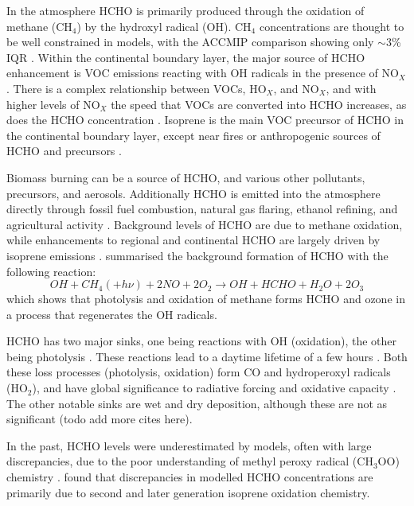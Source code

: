     In the atmosphere HCHO is primarily produced through the oxidation of methane (CH$_4$) by the hydroxyl radical (OH).
    CH$_4$ concentrations are thought to be well constrained in models, with the ACCMIP comparison showing only $\sim3$\% IQR \citep{Young2013}.
    Within the continental boundary layer, the major source of HCHO enhancement is VOC emissions reacting with OH radicals in the presence of NO$_X$ \citep{Wagner2002, Millet2006, Kefauver2014}.
    There is a complex relationship between VOCs, HO$_X$, and NO$_X$, and with higher levels of NO$_X$ the speed that VOCs are converted into HCHO increases, as does the HCHO concentration \citep{Wolfe2016}.
    Isoprene is the main VOC precursor of HCHO in the continental boundary layer, except near fires or anthropogenic sources of HCHO and precursors \citep{Guenther1995, Kefauver2014, Wolfe2016}.
    
    Biomass burning can be a source of HCHO, and various other pollutants, precursors, and aerosols.
    Additionally HCHO is emitted into the atmosphere directly through fossil fuel combustion, natural gas flaring, ethanol refining, and agricultural activity \citep{Wolfe2016}.
    Background levels of HCHO are due to methane oxidation, while enhancements to regional and continental HCHO are largely driven by isoprene emissions \citep{Guenther1995, Palmer2003, Shim2005, Kefauver2014}.
    \citet{Atkinson2000} summarised the background formation of HCHO with the following reaction:
    \begin{equation} \label{ch_LitRev:eqn:MethaneBackground}
    OH + CH_4 (+ h\nu) + 2NO + 2O_2 \rightarrow OH + HCHO + H_2O + 2O_3
    \end{equation}
    which shows that photolysis and oxidation of methane forms HCHO and ozone in a process that regenerates the OH radicals.
    
    HCHO has two major sinks, one being reactions with OH (oxidation), the other being photolysis \citep{Crutzen1999, Wagner2002, Levy1972, Kefauver2014}.
    These reactions lead to a daytime lifetime of a few hours \citep{Atkinson2000, Millet2006}.
    Both these loss processes (photolysis, oxidation) form CO and hydroperoxyl radicals (HO$_2$), and have global significance to radiative forcing and oxidative capacity \citep{Franco2015}.
    The other notable sinks are wet and dry deposition, although these are not as significant \citep{Atkinson2000} (todo add more cites here).
    
    In the past, HCHO levels were underestimated by models, often with large discrepancies, due to the poor understanding of methyl peroxy radical (CH$_3$OO) chemistry \citep{Wagner2002}.
    \cite{Marvin2017} found that discrepancies in modelled HCHO concentrations are primarily due to second and later generation isoprene oxidation chemistry.
    
